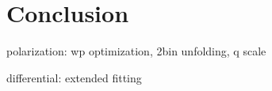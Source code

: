 \chapter{Conclusion}

polarization:
wp optimization, 2bin unfolding, q scale

differential:
extended fitting
